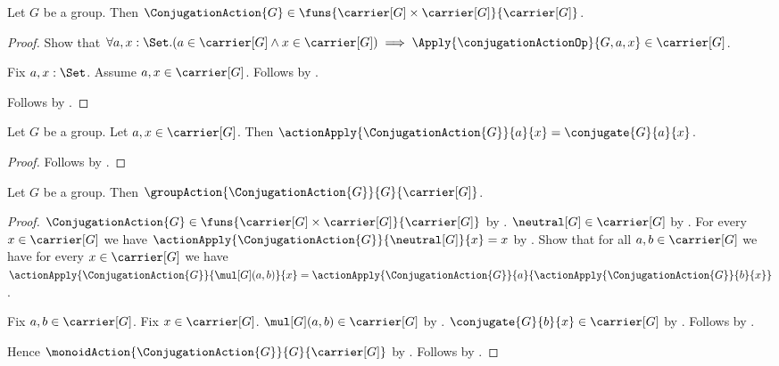 \begin{proposition}\label{conjugation_action_type}
    Let $G$ be a group.
    Then $\ConjugationAction{G}\in
        \funs{\carrier[G]\times\carrier[G]}{\carrier[G]}$.
\end{proposition}
\begin{proof}
    Show that $\forall a,x:\Set.
        (a\in\carrier[G]\land x\in\carrier[G])\implies
        \Apply{\conjugationActionOp}{G,a,x}
            \in\carrier[G]$.
    \begin{subproof}
        Fix $a,x:\Set$.
        Assume $a,x\in\carrier[G]$.
        Follows by
            .
    \end{subproof}
    Follows by
        .
\end{proof}

\begin{proposition}\label{conjugation_action_apply}
    Let $G$ be a group.
    Let $a,x\in\carrier[G]$.
    Then $\actionApply{\ConjugationAction{G}}{a}{x}
        =\conjugate{G}{a}{x}$.
\end{proposition}
\begin{proof}
    Follows by
        .
\end{proof}

\begin{theorem}\label{conjugation_is_group_action}
    Let $G$ be a group.
    Then $\groupAction{\ConjugationAction{G}}{G}{\carrier[G]}$.
\end{theorem}
\begin{proof}
    $\ConjugationAction{G}\in
        \funs{\carrier[G]\times\carrier[G]}{\carrier[G]}$ by
        .
    $\neutral[G]\in\carrier[G]$ by
        .
    For every $x\in\carrier[G]$ we have
        $\actionApply{\ConjugationAction{G}}{\neutral[G]}{x}=x$ by
        .
    Show that for all $a,b\in\carrier[G]$ we have for every
        $x\in\carrier[G]$ we have
        $\actionApply{\ConjugationAction{G}}{\mul[G](a,b)}{x}=
            \actionApply{\ConjugationAction{G}}{a}{
                \actionApply{\ConjugationAction{G}}{b}{x}}$.
    \begin{subproof}
        Fix $a,b\in\carrier[G]$.
        Fix $x\in\carrier[G]$.
        $\mul[G](a,b)\in\carrier[G]$ by
            .
        $\conjugate{G}{b}{x}\in\carrier[G]$ by
            .
        Follows by
            .
    \end{subproof}
    Hence $\monoidAction{\ConjugationAction{G}}{G}{\carrier[G]}$ by
        .
    Follows by .
\end{proof}

